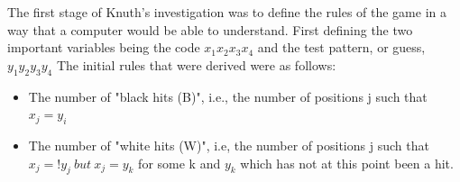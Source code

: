\documentclass[12pt]{article}  %
\theoremstyle{definition}
\theoremstyle{remark}
\begin{document}
\par The first stage of Knuth's investigation was to define the rules of the game in a way that a computer would be able to understand. First defining the two important variables being the code $x_1 x_2 x_3 x_4$ and the test pattern, or guess, $y_1 y_2 y_3 y_4$ The initial rules that were derived were as follows:
\begin {itemize}
	\item {The number of "black hits (B)", i.e., the number of positions j such that $x_j = y_i$}
	\item {The number of "white hits (W)", i.e, the number of positions j such that $x_j =! y_j \  but \ x_j = y_k$ for some k and $y_k$ which has not at this point been a hit.} \cite {Knuth}
\end {itemize}
\end{document}
